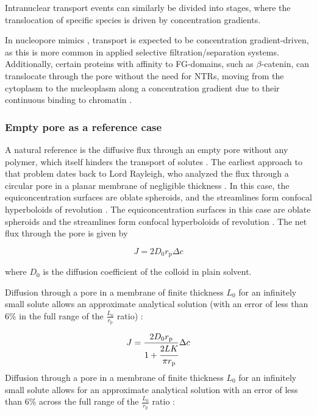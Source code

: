 \documentclass[12pt, a4paper]{article}
\begin{document}
Intranuclear transport events can similarly be divided into stages, where the translocation of specific species is driven by concentration gradients.

In nucleopore mimics \cite{Tijana2008, Yang2021}, transport is expected to be concentration gradient-driven, as this is more common in applied selective filtration/separation systems.
Additionally, certain proteins with affinity to FG-domains, such as $\beta$-catenin, can translocate through the pore without the need for NTRs, moving from the cytoplasm to the nucleoplasm along a concentration gradient due to their continuous binding to chromatin \cite{Rout2003}.

\subsubsection{Empty pore as a reference case}

A natural reference is the diffusive flux through an empty pore without any polymer, which itself hinders the transport of solutes \cite{Deen1987, Sun2024}.
The earliest approach to that problem dates back to Lord Rayleigh, who analyzed the flux through a circular pore in a planar membrane of negligible thickness \cite{Strutt1878}. 
In this case, the equiconcentration surfaces are oblate spheroids, and the streamlines form confocal hyperboloids of revolution \cite{Cooke1966}.
The equiconcentration surfaces in this case are oblate spheroids and the streamlines form confocal hyperboloids of revolution \cite{Cooke1966}.
The net flux through the pore is given by

\begin{equation}
    J=2D_0r_{\text{p}}\Delta c
    \label{eq:flux_Ral}
\end{equation}

\noindent where $D_0$ is the diffusion coefficient of the colloid in plain solvent. 

Diffusion through a pore in a membrane of finite thickness $L_{0}$ for an infinitely small solute allows an approximate analytical solution (with an error of less than 6\% in the full range of the $\frac{L_{0}}{r_{\text{p}}}$ ratio) \cite{Brunn1984}: 

\begin{equation}
    J=\frac{2 D_0 r_{\text{p}}}{1+\cfrac{2L K}{\pi r_{\text{p}}}}\Delta c
    \label{eq:flux_finlength}
\end{equation}
Diffusion through a pore in a membrane of finite thickness $L_{0}$ for an infinitely small solute allows for an approximate analytical solution with an error of less than 6\% across the full range of the $\frac{L_{0}}{r_{\text{p}}}$ ratio \cite{Brunn1984}:
\end{document}

